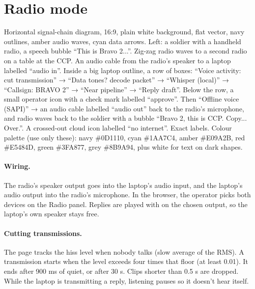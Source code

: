 \section{Radio mode}

{Horizontal signal-chain diagram, 16:9, plain white background, flat vector, navy outlines, amber audio waves, cyan data arrows.
Left: a soldier with a handheld radio, a speech bubble ``This is Bravo 2...''. Zig-zag radio waves to a second radio on a
table at the CCP. An audio cable from the radio's speaker to a laptop labelled ``audio in''. Inside a big laptop outline, a row
of boxes: ``Voice activity: cut transmission'' → ``Data tones? decode packet'' → ``Whisper (local)'' → ``Callsign: BRAVO 2''
→ ``Near pipeline'' → ``Reply draft''. Below the row, a small operator icon with a check mark labelled ``approve''. Then
``Offline voice (SAPI)'' → an audio cable labelled ``audio out'' back to the radio's microphone, and radio waves back to the
soldier with a bubble ``Bravo 2, this is CCP. Copy... Over.''. A crossed-out cloud icon labelled ``no internet''. Exact labels. Colour palette (use only these): navy \#0D1110, cyan \#1AA7C4, amber \#E09A2B, red \#E5484D, green \#3FA877, grey \#8B9A94, plus white for text on dark shapes.}

\paragraph{Wiring.} The radio's speaker output goes into the laptop's audio input, and the laptop's audio output into the
radio's microphone. In the browser, the operator picks both devices on the Radio panel. Replies are played with
 on the chosen output, so the laptop's own speaker stays free.

\paragraph{Cutting transmissions.} The page tracks the hiss level when nobody talks (slow average of the RMS). A
transmission starts when the level exceeds four times that floor (at least 0.01). It ends after 900 ms of quiet, or after
30 s. Clips shorter than 0.5 s are dropped. While the laptop is transmitting a reply, listening pauses so it doesn't hear
itself.

